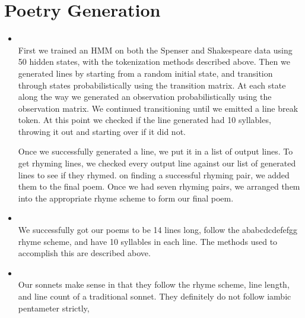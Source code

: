 \section{Poetry Generation}
\medskip
\begin{itemize}



    \item {} \\
    First we trained an HMM on both the Spenser and Shakespeare data using 50
    hidden states, with the tokenization methods described above. Then we generated
    lines by starting from a random initial state, and transition through states
    probabilistically using the transition matrix. At each state along the way we
    generated an observation probabilistically using the observation matrix. We
    continued transitioning until we emitted a line break token. At this point
    we checked if the line generated had 10 syllables, throwing it out and starting
    over if it did not.

    Once we successfully generated a line, we put it in a list of output lines.
    To get rhyming lines, we checked every output line against our list of generated
    lines to see if they rhymed. on finding a successful rhyming pair, we added them
    to the final poem. Once we had seven rhyming pairs, we arranged them into the
    appropriate rhyme scheme to form our final poem.

    \item {} \\
    We successfully got our poems to be 14 lines long, follow the ababcdcdefefgg
    rhyme scheme, and have 10 syllables in each line. The methods used to accomplish
    this are described above.

    \item {} \\
    Our sonnets make sense in that they follow the rhyme scheme, line length,
    and line count of a traditional sonnet. They definitely do not follow
    iambic pentameter strictly,

\end{itemize}



